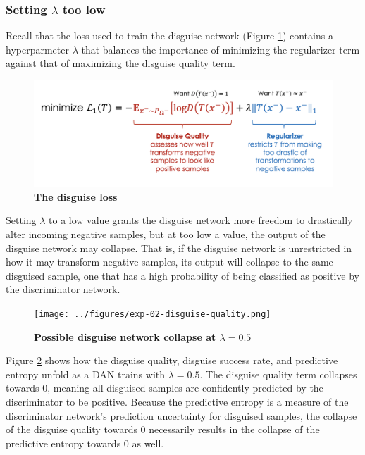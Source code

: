 \documentclass{proc}
\begin{document}
\subsubsection{Setting $\lambda$ too low}

Recall that the loss used to train the disguise network (Figure \ref{fig:disguise-loss}) contains a hyperparmeter $\lambda$ that balances the importance of minimizing the regularizer term against that of maximizing the disguise quality term.

\begin{figure}[h!]
		\includegraphics*[scale=0.22]{../figures/disguise-loss.png}
		\caption{\textbf{The disguise loss}}
		\label{fig:disguise-loss}
\end{figure}

Setting $\lambda$ to a low value grants the disguise network more freedom to drastically alter incoming negative samples, but at too low a value, the output of the disguise network may collapse. That is, if the disguise network is unrestricted in how it may transform negative samples, its output will collapse to the same disguised sample, one that has a high probability of being classified as positive by the discriminator network.

\begin{figure}[h!]
		\texttt{[image: ../figures/exp-02-disguise-quality.png]}
		\caption{\textbf{Possible disguise network collapse at $\lambda = 0.5$}}
		\label{fig:exp-02-disguise-quality}
\end{figure}

Figure \ref{fig:exp-02-disguise-quality} shows how the disguise quality, disguise success rate, and predictive entropy unfold as a DAN trains with $\lambda = 0.5$. The disguise quality term collapses towards $0$, meaning all disguised samples are confidently predicted by the discriminator to be positive. Because the predictive entropy is a measure of the discriminator network's prediction uncertainty for disguised samples, the collapse of the disguise quality towards $0$ necessarily results in the collapse of the predictive entropy towards $0$ as well.
\end{document}
